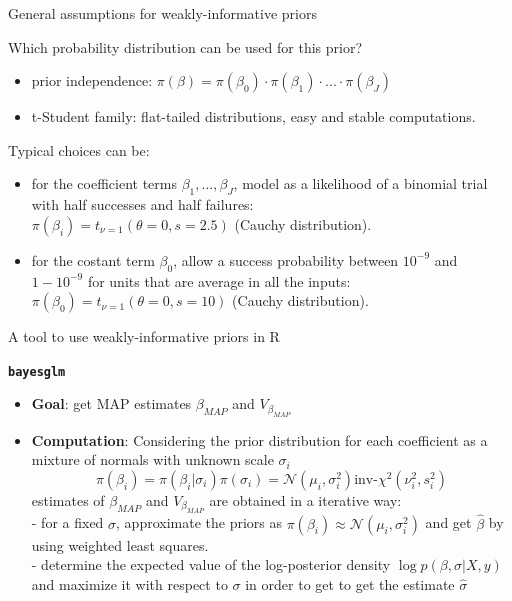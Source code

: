 \documentclass{beamer}
\begin{document}
\begin{frame}{General assumptions for weakly-informative priors}
	
	Which probability distribution can be used for this prior?
	
	\vspace{0.2cm}
	
	\begin{itemize}
		\item prior independence: $\pi(\beta) = \pi(\beta_0) \cdot \pi(\beta_1) \cdot ... \cdot \pi(\beta_J)$ 
		\item t-Student family: flat-tailed distributions, easy and stable computations.
	\end{itemize}
	Typical choices can be:
	\begin{itemize}
		\item  for the coefficient terms $\beta_1, ..., \beta_J$, model as a likelihood of a binomial trial with half successes and half failures:  \\
		$\pi(\beta_i) = t_{\nu=1}(\theta=0, s=2.5)$ (Cauchy distribution).
		\vspace{0.3cm}
		\item for the costant term $\beta_0$, allow a success probability between $10^{-9}$ and $1-10^{-9}$ for units
		that are average in all the inputs: \\
		$\pi(\beta_0) = t_{\nu=1}(\theta=0, s=10)$ (Cauchy distribution).
	\end{itemize}
	
\end{frame}



\begin{frame}{A tool to use weakly-informative priors in R}
	
		\centering
		\textbf{\texttt{bayesglm}}\\
		\vspace{0.2cm}
		\begin{itemize}
			\item \textbf{Goal}: \small get MAP estimates $\beta_{MAP}$ and $V_{\beta_{MAP}}$
			\item \textbf{Computation}: \small {Considering the prior distribution for each coefficient as a mixture of normals with unknown scale $\sigma_i$}  $$\pi(\beta_i) = \pi(\beta_i|\sigma_i) \pi(\sigma_i) = \mathcal{N}(\mu_i, \sigma_i^2) \text{inv-}\chi^2(\nu^2_i, s^2_i)$$
			estimates of $\beta_{MAP}$ and $V_{\beta_{MAP}}$ are obtained in a iterative way: \\
			\vspace{0.2cm}
			- for a fixed $\sigma$, approximate the priors as $\pi(\beta_i) \approx \mathcal{N}(\mu_i, \sigma_i^2)$ and get $\hat{\beta}$ by using weighted least squares. \\
			- determine the expected value of the log-posterior density $\log p(\beta, \sigma | X, y)$ and maximize it with respect to $\sigma$ in order to get to get the estimate $\hat{\sigma}$
		\end{itemize}
		
\end{frame}
\end{document}

